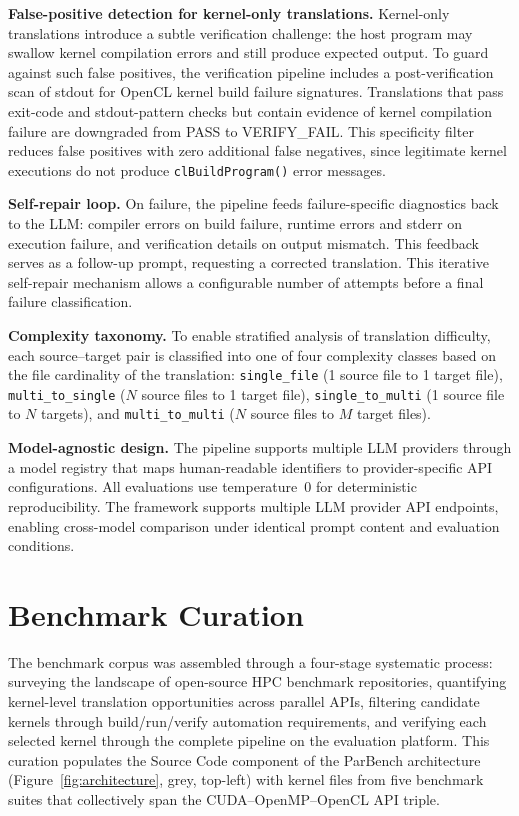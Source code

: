 \documentclass[conference]{IEEEtran}
\begin{document}
\textbf{False-positive detection for kernel-only translations.} Kernel-only translations introduce a subtle verification challenge: the host program may swallow kernel compilation errors and still produce expected output. To guard against such false positives, the verification pipeline includes a post-verification scan of stdout for OpenCL kernel build failure signatures. Translations that pass exit-code and stdout-pattern checks but contain evidence of kernel compilation failure are downgraded from PASS to VERIFY\_FAIL. This specificity filter reduces false positives with zero additional false negatives, since legitimate kernel executions do not produce \texttt{clBuildProgram()} error messages.

\textbf{Self-repair loop.} On failure, the pipeline feeds failure-specific diagnostics back to the LLM: compiler errors on build failure, runtime errors and stderr on execution failure, and verification details on output mismatch. This feedback serves as a follow-up prompt, requesting a corrected translation. This iterative self-repair mechanism allows a configurable number of attempts before a final failure classification.

\textbf{Complexity taxonomy.} To enable stratified analysis of translation difficulty, each source--target pair is classified into one of four complexity classes based on the file cardinality of the translation: \texttt{single\_file} (1 source file to 1 target file), \texttt{multi\_to\_single} ($N$ source files to 1 target file), \texttt{single\_to\_multi} (1 source file to $N$ targets), and \texttt{multi\_to\_multi} ($N$ source files to $M$ target files).

\textbf{Model-agnostic design.} The pipeline supports multiple LLM providers through a model registry that maps human-readable identifiers to provider-specific API configurations. All evaluations use temperature~0 for deterministic reproducibility. The framework supports multiple LLM provider API endpoints, enabling cross-model comparison under identical prompt content and evaluation conditions.

\section{Benchmark Curation}
\label{sec:benchmark-curation}

The benchmark corpus was assembled through a four-stage systematic process: surveying the landscape of open-source HPC benchmark repositories, quantifying kernel-level translation opportunities across parallel APIs, filtering candidate kernels through build/run/verify automation requirements, and verifying each selected kernel through the complete pipeline on the evaluation platform. This curation populates the Source Code component of the ParBench architecture (Figure~\ref{fig:architecture}, grey, top-left) with kernel files from five benchmark suites that collectively span the CUDA--OpenMP--OpenCL API triple.
\end{document}

